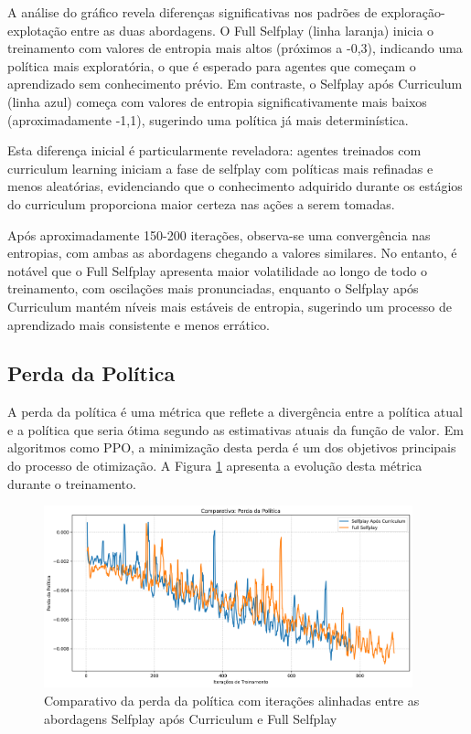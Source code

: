A análise do gráfico revela diferenças significativas nos padrões de exploração-explotação entre as duas abordagens. O Full Selfplay (linha laranja) inicia o treinamento com valores de entropia mais altos (próximos a -0,3), indicando uma política mais exploratória, o que é esperado para agentes que começam o aprendizado sem conhecimento prévio. Em contraste, o Selfplay após Curriculum (linha azul) começa com valores de entropia significativamente mais baixos (aproximadamente -1,1), sugerindo uma política já mais determinística.

Esta diferença inicial é particularmente reveladora: agentes treinados com curriculum learning iniciam a fase de selfplay com políticas mais refinadas e menos aleatórias, evidenciando que o conhecimento adquirido durante os estágios do curriculum proporciona maior certeza nas ações a serem tomadas.

Após aproximadamente 150-200 iterações, observa-se uma convergência nas entropias, com ambas as abordagens chegando a valores similares. No entanto, é notável que o Full Selfplay apresenta maior volatilidade ao longo de todo o treinamento, com oscilações mais pronunciadas, enquanto o Selfplay após Curriculum mantém níveis mais estáveis de entropia, sugerindo um processo de aprendizado mais consistente e menos errático.

\subsection{Perda da Política}

A perda da política é uma métrica que reflete a divergência entre a política atual e a política que seria ótima segundo as estimativas atuais da função de valor. Em algoritmos como PPO, a minimização desta perda é um dos objetivos principais do processo de otimização. A Figura \ref{fig:policy_loss} apresenta a evolução desta métrica durante o treinamento.

\begin{figure}[H]
    \centering
    \includegraphics[width=0.95\textwidth]{fig/graficos_trabalho/graficos_experimentos/geral/comparativo_perda_politica.png}
    \caption{Comparativo da perda da política com iterações alinhadas entre as abordagens Selfplay após Curriculum e Full Selfplay}
    \label{fig:policy_loss}
\end{figure}

